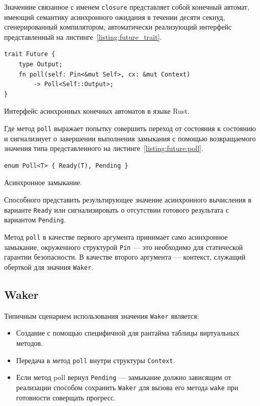 Значениие связанное с именем \verb|closure| представляет собой конечный автомат, имеющий семантику асинхронного ожидания в течении десяти секнуд, сгенерированный компилятором, автоматически реализующий интерфейс представленный на листинге~\ref{listing:future_trait}.

\begin{listing}[H]
    \begin{verbatim}
trait Future {
    type Output;
    fn poll(self: Pin<&mut Self>, cx: &mut Context)
        -> Poll<Self::Output>;
}
    \end{verbatim}

    \caption{Интерфейс асинхронных конечных автоматов в языке Rust.}
    \label{listing:future_trait}
\end{listing}

Где метод \verb|poll| выражает попытку совершить переход от состояния к состоянию и сигнализиует о завершении выполнения замыкания с помощью возвращаемого значения типа представленного на листинге~\ref{listing:future:poll}.

\begin{listing}[H]
    \begin{verbatim}
enum Poll<T> { Ready(T), Pending }
    \end{verbatim}

    \caption{Асинхронное замыкание.}
    \label{listing:future:poll}
\end{listing}

Способного представить результирующее значение асинхронного вычисления в варианте \verb|Ready| или сигнализировать о отсутствии готового результата с вариантом \verb|Pending|.

Метод \verb|poll| в качестве первого аргумента принимает само асинхронное замыкание, окруженного структурой \verb|Pin| --- это необходимо для статической гарантии безопасности. В качестве второго аргумента --- контекст, служащий оберткой для значния \verb|Waker|.

\subsection{Waker}

Типичным сценарием использования значения \verb|Waker| является:

\begin{itemize}
    \item Создание с помощью специфичной для рантайма таблицы виртуальных методов.
    \item Передача в метод \verb|poll| внутри структуры \verb|Context|.
    \item Если метод poll вернул \verb|Pending| --- замыкание должно зависящим от реализации способом сохранить \verb|Waker| для вызова его метода \verb|wake| при готовности соверщать прогресс.
\end{itemize}

